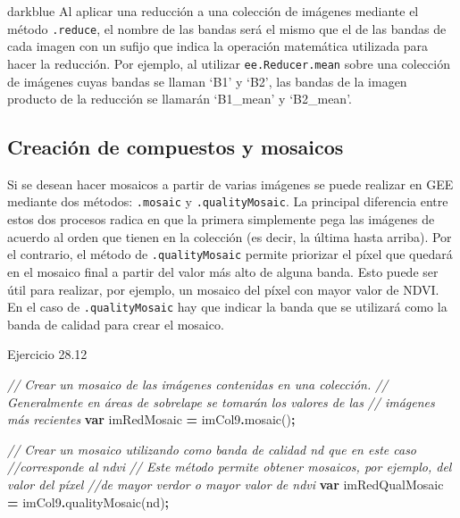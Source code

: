 \documentclass[
  12pt,
  letterpaper,
  twoside]{book}
\newenvironment{Shaded}{\begin{snugshade}}{\end{snugshade}}
\newcommand{\CommentTok}[1]{\textcolor[rgb]{0.56,0.35,0.01}{\textit{#1}}}
\newcommand{\FunctionTok}[1]{\textcolor[rgb]{0.00,0.00,0.00}{#1}}
\newcommand{\KeywordTok}[1]{\textcolor[rgb]{0.13,0.29,0.53}{\textbf{#1}}}
\newcommand{\NormalTok}[1]{#1}
\newcommand{\OperatorTok}[1]{\textcolor[rgb]{0.81,0.36,0.00}{\textbf{#1}}}
\newcommand{\StringTok}[1]{\textcolor[rgb]{0.31,0.60,0.02}{#1}}
\begin{document}
\begin{bluebox2}

\begin{awesomeblock}{5pt}{\faLightbulb}{darkblue}
Al aplicar una reducción a una colección de imágenes mediante el método \texttt{.reduce}, el nombre de las bandas será el mismo que el de las bandas de cada imagen con un sufijo que indica la operación matemática utilizada para hacer la reducción. Por ejemplo, al utilizar \texttt{ee.Reducer.mean} sobre una colección de imágenes cuyas bandas se llaman `B1' y `B2', las bandas de la imagen producto de la reducción se llamarán `B1\_mean' y `B2\_mean'.

\end{awesomeblock}

\end{bluebox2}

\hypertarget{creaciuxf3n-de-compuestos-y-mosaicos}{%
\subsection*{Creación de compuestos y mosaicos}\label{creaciuxf3n-de-compuestos-y-mosaicos}}

Si se desean hacer mosaicos a partir de varias imágenes se puede realizar en GEE mediante dos métodos: \texttt{.mosaic} y \texttt{.qualityMosaic}. La principal diferencia entre estos dos procesos radica en que la primera simplemente pega las imágenes de acuerdo al orden que tienen en la colección (es decir, la última hasta arriba). Por el contrario, el método de \texttt{.qualityMosaic} permite priorizar el píxel que quedará en el mosaico final a partir del valor más alto de alguna banda. Esto puede ser útil para realizar, por ejemplo, un mosaico del píxel con mayor valor de NDVI. En el caso de \texttt{.qualityMosaic} hay que indicar la banda que se utilizará como la banda de calidad para crear el mosaico.

Ejercicio 28.12

\begin{Shaded}
\begin{Highlighting}[]
\CommentTok{// Crear un mosaico de las imágenes contenidas en una colección. }
\CommentTok{// Generalmente en áreas de sobrelape se tomarán los valores de las }
\CommentTok{// imágenes más recientes}
\KeywordTok{var}\NormalTok{ imRedMosaic }\OperatorTok{=}\NormalTok{ imCol9}\OperatorTok{.}\FunctionTok{mosaic}\NormalTok{()}\OperatorTok{;}

\CommentTok{// Crear un mosaico utilizando como banda de calidad \textquotesingle{}nd\textquotesingle{} que en este caso}
\CommentTok{//corresponde al ndvi}
\CommentTok{// Este método permite obtener mosaicos, por ejemplo, del valor del píxel}
\CommentTok{//de mayor verdor o mayor valor de ndvi}
\KeywordTok{var}\NormalTok{ imRedQualMosaic }\OperatorTok{=}\NormalTok{ imCol9}\OperatorTok{.}\FunctionTok{qualityMosaic}\NormalTok{(}\StringTok{\textquotesingle{}nd\textquotesingle{}}\NormalTok{)}\OperatorTok{;}
\end{Highlighting}
\end{Shaded}
\end{document}
